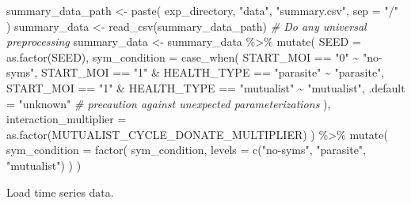 \documentclass[
]{book}
\newenvironment{Shaded}{\begin{snugshade}}{\end{snugshade}}
\newcommand{\AttributeTok}[1]{\textcolor[rgb]{0.77,0.63,0.00}{#1}}
\newcommand{\CommentTok}[1]{\textcolor[rgb]{0.56,0.35,0.01}{\textit{#1}}}
\newcommand{\FunctionTok}[1]{\textcolor[rgb]{0.00,0.00,0.00}{#1}}
\newcommand{\NormalTok}[1]{#1}
\newcommand{\OtherTok}[1]{\textcolor[rgb]{0.56,0.35,0.01}{#1}}
\newcommand{\SpecialCharTok}[1]{\textcolor[rgb]{0.00,0.00,0.00}{#1}}
\newcommand{\StringTok}[1]{\textcolor[rgb]{0.31,0.60,0.02}{#1}}
\begin{document}
\begin{Shaded}
\begin{Highlighting}[]
\NormalTok{summary\_data\_path }\OtherTok{\textless{}{-}} \FunctionTok{paste}\NormalTok{(}
\NormalTok{  exp\_directory,}
  \StringTok{"data"}\NormalTok{,}
  \StringTok{"summary.csv"}\NormalTok{,}
  \AttributeTok{sep =} \StringTok{"/"}
\NormalTok{)}
\NormalTok{summary\_data }\OtherTok{\textless{}{-}} \FunctionTok{read\_csv}\NormalTok{(summary\_data\_path)}
\CommentTok{\# Do any universal preprocessing}
\NormalTok{summary\_data }\OtherTok{\textless{}{-}}\NormalTok{ summary\_data }\SpecialCharTok{\%\textgreater{}\%}
  \FunctionTok{mutate}\NormalTok{(}
    \AttributeTok{SEED =} \FunctionTok{as.factor}\NormalTok{(SEED),}
    \AttributeTok{sym\_condition =} \FunctionTok{case\_when}\NormalTok{(}
\NormalTok{      START\_MOI }\SpecialCharTok{==} \StringTok{"0"} \SpecialCharTok{\textasciitilde{}} \StringTok{"no{-}syms"}\NormalTok{,}
\NormalTok{      START\_MOI }\SpecialCharTok{==} \StringTok{"1"} \SpecialCharTok{\&}\NormalTok{ HEALTH\_TYPE }\SpecialCharTok{==} \StringTok{"parasite"} \SpecialCharTok{\textasciitilde{}} \StringTok{"parasite"}\NormalTok{,}
\NormalTok{      START\_MOI }\SpecialCharTok{==} \StringTok{"1"} \SpecialCharTok{\&}\NormalTok{ HEALTH\_TYPE }\SpecialCharTok{==} \StringTok{"mutualist"} \SpecialCharTok{\textasciitilde{}} \StringTok{"mutualist"}\NormalTok{,}
      \AttributeTok{.default =} \StringTok{"unknown"} \CommentTok{\# precaution against unexpected parameterizations}
\NormalTok{    ),}
    \AttributeTok{interaction\_multiplier =} \FunctionTok{as.factor}\NormalTok{(MUTUALIST\_CYCLE\_DONATE\_MULTIPLIER)}
\NormalTok{  ) }\SpecialCharTok{\%\textgreater{}\%}
  \FunctionTok{mutate}\NormalTok{(}
    \AttributeTok{sym\_condition =} \FunctionTok{factor}\NormalTok{(}
\NormalTok{      sym\_condition,}
      \AttributeTok{levels =} \FunctionTok{c}\NormalTok{(}\StringTok{"no{-}syms"}\NormalTok{, }\StringTok{"parasite"}\NormalTok{, }\StringTok{"mutualist"}\NormalTok{)}
\NormalTok{    )}
\NormalTok{  )}
\end{Highlighting}
\end{Shaded}

Load time series data.
\end{document}
